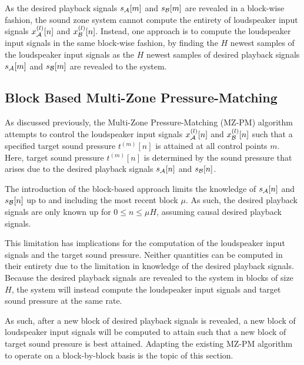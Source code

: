 As the desired playback signals $s_{\mathcal{A}}[m]$ and $s_{\mathcal{B}}[m]$ are revealed in a block-wise fashion, the sound zone system cannot compute the entirety of 
loudspeaker input signals $x^{(l)}_{\mathcal{A}}[n]$ and $x^{(l)}_{\mathcal{B}}[n]$.
Instead, one approach is to compute the loudspeaker input signals in the same block-wise fashion, by finding the $H$ newest samples of the loudspeaker input signals 
as the $H$ newest samples of desired playback signals $s_{\mathcal{A}}[m]$ and $s_{\mathcal{B}}[m]$ are revealed to the system.

\subsection{Block Based Multi-Zone Pressure-Matching}
As discussed previously, the Multi-Zone Pressure-Matching (MZ-PM) algorithm attempts to control the loudspeaker input signals 
$x^{(l)}_{\mathcal{A}}[n]$ and $x^{(l)}_{\mathcal{B}}[n]$ such that a specified target sound pressure $t^{(m)}[n]$ is attained at all control points $m$.
Here, target sound pressure $t^{(m)}[n]$ is determined by the sound pressure that arises due to the 
desired playback signals $s_{\mathcal{A}}[n]$ and $s_{\mathcal{B}}[n]$.

The introduction of the block-based approach limits the knowledge of $s_{\mathcal{A}}[n]$ and $s_{\mathcal{B}}[n]$ up to and including the most recent block $\mu$.
As such, the desired playback signals are only known up for $0 \leq n \leq \mu H$, assuming causal desired playback signals.

This limitation has implications for the computation of the loudspeaker input signals and the target sound pressure.
Neither quantities can be computed in their entirety due to the limitation in knowledge of the desired playback signals.
Because the desired playback signals are revealed to the system in blocks of size $H$, the system will instead compute the loudspeaker input signals and target sound pressure
at the same rate.

As such, after a new block of desired playback signals is revealed, 
a new block of loudspeaker input signals will be computed to attain such that a new block of target sound pressure is best attained.
Adapting the existing MZ-PM algorithm to operate on a block-by-block basis is the topic of this section.

